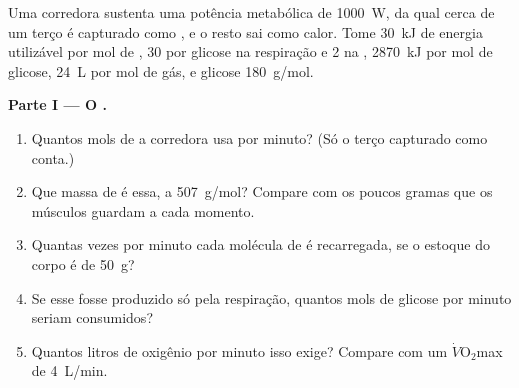 \begin{problem}
\label{pb:g12:respiration-fermentation:1}
Uma corredora sustenta uma potência metabólica de \qty{1000}{W}, da
qual cerca de um terço é capturado como , e o resto sai como calor.
Tome \qty{30}{kJ} de energia utilizável por mol de , 30  por
glicose na respiração e 2 na , \qty{2870}{kJ} por mol de
glicose, \qty{24}{L} por mol de gás, e glicose \qty{180}{g/mol}.

\medskip
\noindent\textbf{Parte I --- O .}
\begin{enumerate}
  \item Quantos mols de  a corredora usa por minuto? (Só o terço
        capturado como  conta.)
  \item Que massa de  é essa, a \qty{507}{g/mol}? Compare com os
        poucos gramas que os músculos guardam a cada momento.
  \item Quantas vezes por minuto cada molécula de  é recarregada, se
        o estoque do corpo é de \qty{50}{g}?
  \item Se esse  fosse produzido só pela respiração, quantos mols de
        glicose por minuto seriam consumidos?
  \item Quantos litros de oxigênio por minuto isso exige? Compare com
        um $\dot V\!\mathrm{O_2}$max de \qty{4}{L/min}.
\end{enumerate}


\end{problem}
